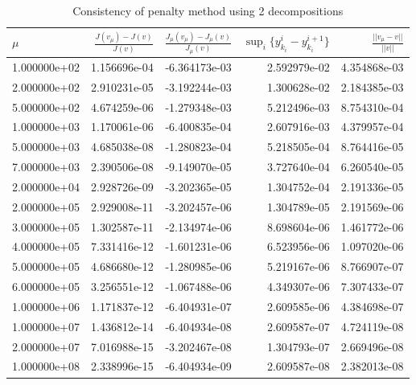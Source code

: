 \begin{table}[h]
\centering
\caption{Consistency of penalty method using 2 decompositions}
\label{Cosistency_table}
\begin{tabular}{lrrrr}
\toprule 
{} $\mu$&  $\frac{J(v_{\mu})-J(v)}{J(v)}$ &  $\frac{J_{\mu}(v_{\mu})-J_{\mu}(v)}{J_{\mu}(v)}$ &         $\sup_i\{y_{k_i}^i-y_{k_i}^{i+1}\}$ &    $\frac{||v_{\mu}-v||}{||v||}$ \\
\midrule
1.000000e+02 &      1.156696e-04 &            -6.364173e-03 &  2.592979e-02 &  4.354868e-03 \\
2.000000e+02 &      2.910231e-05 &            -3.192244e-03 &  1.300628e-02 &  2.184385e-03 \\
5.000000e+02 &      4.674259e-06 &            -1.279348e-03 &  5.212496e-03 &  8.754310e-04 \\
1.000000e+03 &      1.170061e-06 &            -6.400835e-04 &  2.607916e-03 &  4.379957e-04 \\
5.000000e+03 &      4.685038e-08 &            -1.280823e-04 &  5.218505e-04 &  8.764416e-05 \\
7.000000e+03 &      2.390506e-08 &            -9.149070e-05 &  3.727640e-04 &  6.260540e-05 \\
2.000000e+04 &      2.928726e-09 &            -3.202365e-05 &  1.304752e-04 &  2.191336e-05 \\
2.000000e+05 &      2.929008e-11 &            -3.202457e-06 &  1.304789e-05 &  2.191569e-06 \\
3.000000e+05 &      1.302587e-11 &            -2.134974e-06 &  8.698604e-06 &  1.461772e-06 \\
4.000000e+05 &      7.331416e-12 &            -1.601231e-06 &  6.523956e-06 &  1.097020e-06 \\
5.000000e+05 &      4.686680e-12 &            -1.280985e-06 &  5.219167e-06 &  8.766907e-07 \\
6.000000e+05 &      3.256551e-12 &            -1.067488e-06 &  4.349307e-06 &  7.307433e-07 \\
1.000000e+06 &      1.171837e-12 &            -6.404931e-07 &  2.609585e-06 &  4.384698e-07 \\
1.000000e+07 &      1.436812e-14 &            -6.404934e-08 &  2.609587e-07 &  4.724119e-08 \\
2.000000e+07 &      7.016988e-15 &            -3.202467e-08 &  1.304793e-07 &  2.669496e-08 \\
1.000000e+08 &      2.338996e-15 &            -6.404934e-09 &  2.609587e-08 &  2.382013e-08 \\

\end{tabular}
\end{table}
